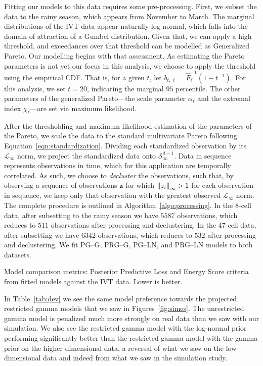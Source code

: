 Fitting our models to this data requires some pre-processing. First, we subset the data to the rainy
  season, which appears from November to March.  The marginal distributions of the
  IVT data appear naturally log-normal, which falls into the domain of attraction of a Gumbel
  distribution.  Given that, we can apply a high threshold, and exceedances over that threshold can
  be modelled as Generalized Pareto.  Our modelling begins with that assessment.  As estimating
  the Pareto parameters is not yet our focus in this analysis, we choose to apply the threshold
  using the empirical CDF.  That is, for a given $t$, let $b_{t,\ell} = \hat{F}_{\ell}^{-1}(1 - t^{-1})$.  For
  this analysis, we set $t = 20$, indicating the marginal $95$ percentile.  The other parameters of the
  generalized Pareto---the scale parameter $\alpha_{\ell}$ and the extremal index $\chi_{\ell}$---are set via
  maximum likelihood. 

After the thresholding and maximum likelihood estimation of the parameters of the Pareto, we scale
  the data to the standard multivariate Pareto following Equation~\ref{eqn:standardization}.  
  Dividing each standardized observation by its $\mathcal{L}_{\infty}$ norm, we project the 
  standardized data onto $\mathcal{S}_{\infty}^{d-1}$. Data in sequence represents observations
  in time, which for this application are temporally correlated.  As such, we
  choose to \emph{decluster} the observations, such that, by observing a sequence of observations
  $\bm{ z}$ for which $\inorm{z_i} > 1$ for each observation in sequence, we keep only that observation
  with the greatest observed $\mathcal{L}_{\infty}$ norm.  The complete procedure is outlined in
  Algorithm~\ref{algo:processing}.  In the 8-cell data, after subsetting to the rainy season we 
  have $5587$ observations, which reduces to $511$ observations after processing and declustering.  
  In the 47 cell data, after subsetting we have $6342$ observations, which reduces to $532$ after 
  processing and declustering.  We fit PG--G, PRG--G, PG--LN, and PRG--LN models to both datasets.

\begin{table}[ht]
  \centering
  \caption{Model comparison metrics: Posterior Predictive Loss and Energy Score criteria from fitted
    models against the IVT data.  Lower is better.
  \label{tab:dev}}
  
\end{table}

In Table~\ref{tab:dev} we see the same model preference towards the projected restricted 
  gamma models that we saw in Figures~\ref{fig:simes}.  The unrestricted gamma model is 
  penalized much more strongly on real data than we saw with our simulation.  We also see
  the restricted gamma model with the log-normal prior performing significantly better 
  than the restricted gamma model with the gamma prior on the higher dimensional data, a reversal
  of what we saw on the low dimensional data and indeed from what we saw in the simulation study.

